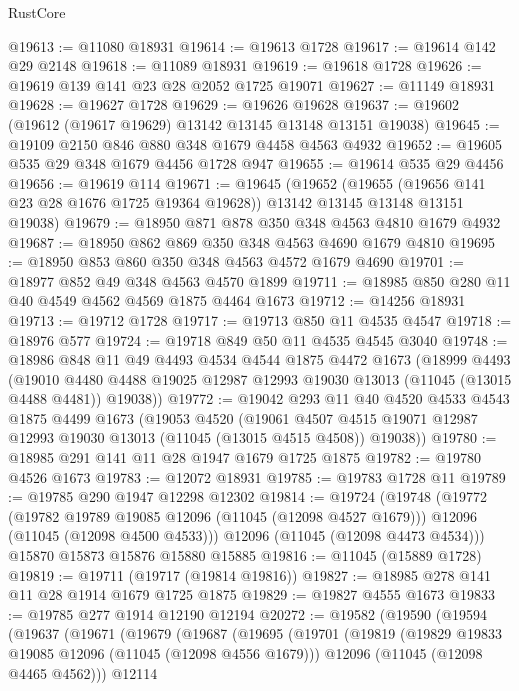 \begin{lexlean}{RustCore}
\begin{coremodule}
@19613 := @11080 @18931
@19614 := @19613 @1728
@19617 := @19614 @142 @29 @2148
@19618 := @11089 @18931
@19619 := @19618 @1728
@19626 := @19619 @139 @141 @23 @28 @2052 @1725 @19071
@19627 := @11149 @18931
@19628 := @19627 @1728
@19629 := @19626 @19628
@19637 := @19602 (@19612 (@19617 @19629) @13142 @13145 @13148 @13151 @19038)
@19645 := @19109 @2150 @846 @880 @348 @1679 @4458 @4563 @4932
@19652 := @19605 @535 @29 @348 @1679 @4456 @1728 @947
@19655 := @19614 @535 @29 @4456
@19656 := @19619 @114
@19671 := @19645
    (@19652
      (@19655 (@19656 @141 @23 @28 @1676 @1725 @19364 @19628))
      @13142
      @13145
      @13148
      @13151
      @19038)
@19679 := @18950 @871 @878 @350 @348 @4563 @4810 @1679 @4932
@19687 := @18950 @862 @869 @350 @348 @4563 @4690 @1679 @4810
@19695 := @18950 @853 @860 @350 @348 @4563 @4572 @1679 @4690
@19701 := @18977 @852 @49 @348 @4563 @4570 @1899
@19711 := @18985 @850 @280 @11 @40 @4549 @4562 @4569 @1875 @4464 @1673
@19712 := @14256 @18931
@19713 := @19712 @1728
@19717 := @19713 @850 @11 @4535 @4547
@19718 := @18976 @577
@19724 := @19718 @849 @50 @11 @4535 @4545 @3040
@19748 := @18986
    @848
    @11
    @49
    @4493
    @4534
    @4544
    @1875
    @4472
    @1673
    (@18999
      @4493
      (@19010 @4480 @4488 @19025 @12987 @12993 @19030 @13013 (@11045 (@13015 @4488 @4481)) @19038))
@19772 := @19042
    @293
    @11
    @40
    @4520
    @4533
    @4543
    @1875
    @4499
    @1673
    (@19053
      @4520
      (@19061 @4507 @4515 @19071 @12987 @12993 @19030 @13013 (@11045 (@13015 @4515 @4508)) @19038))
@19780 := @18985 @291 @141 @11 @28 @1947 @1679 @1725 @1875
@19782 := @19780 @4526 @1673
@19783 := @12072 @18931
@19785 := @19783 @1728 @11
@19789 := @19785 @290 @1947 @12298 @12302
@19814 := @19724
    (@19748
      (@19772
        (@19782 @19789 @19085 @12096 (@11045 (@12098 @4527 @1679)))
        @12096
        (@11045 (@12098 @4500 @4533)))
      @12096
      (@11045 (@12098 @4473 @4534)))
    @15870
    @15873
    @15876
    @15880
    @15885
@19816 := @11045 (@15889 @1728)
@19819 := @19711 (@19717 (@19814 @19816))
@19827 := @18985 @278 @141 @11 @28 @1914 @1679 @1725 @1875
@19829 := @19827 @4555 @1673
@19833 := @19785 @277 @1914 @12190 @12194
@20272 := @19582
    (@19590
      (@19594
        (@19637
          (@19671
            (@19679
              (@19687
                (@19695
                  (@19701
                    (@19819
                      (@19829 @19833 @19085 @12096 (@11045 (@12098 @4556 @1679)))
                      @12096
                      (@11045 (@12098 @4465 @4562)))
                    @12114

\end{coremodule}
\end{lexlean}
